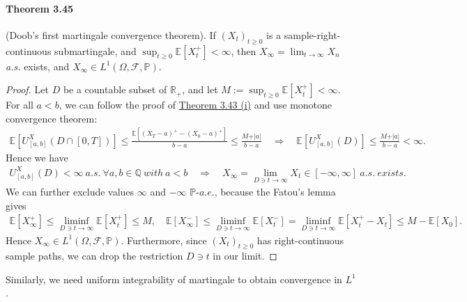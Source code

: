 \documentclass{article}
\numberwithin{equation}{section}
\newcommand{\E}{\mathbb{E}}
\renewcommand{\P}{\mathbb{P}}
\theoremstyle{plain}
\theoremstyle{definition}
\begin{document}
\paragraph{Theorem 3.45\label{thm:3.45}} (Doob's first martingale convergence theorem). If $(X_t)_{t\geq 0}$ is a sample-right-continuous submartingale, and $\sup_{t\geq 0}\E[X_t^+]<\infty$, then $X_\infty=\lim_{t\to\infty}X_n$ \textit{a.s.} exists, and $X_\infty\in L^1(\Omega,\mathscr{F},\P)$.
\begin{proof}
Let $D$ be a countable subset of $\mathbb{R}_+$, and let $M:=\sup_{t\geq 0}\E[X_t^+]<\infty$. For all $a<b$, we can follow the proof of \hyperref[thm:3.43]{Theorem 3.43 (i)} and use monotone convergence theorem:
\begin{align*}
	\E\left[U_{[a,b]}^X(D\cap[0,T])\right]\leq\frac{\E[(X_T-a)^+-(X_0-a)^+]}{b-a}\leq\frac{M+\vert a\vert}{b-a} \quad\Rightarrow\quad \E\left[U_{[a,b]}^X(D)\right]\leq\frac{M+\vert a\vert}{b-a} < \infty.
\end{align*}
Hence we have
\begin{align*}
	U_{[a,b]}^X(D)<\infty\ a.s.\ \forall a,b\in\mathbb{Q}\ with\ a<b\quad\Rightarrow\quad X_\infty=\lim_{D\ni t\to\infty} X_t\in[-\infty,\infty]\ a.s.\ exists.
\end{align*}
We can further exclude values $\infty$ and $-\infty$ $\P$-$a.e.$, because the Fatou's lemma gives
\begin{align*}
	\E[X_\infty^+]\leq\liminf_{D\ni t\to\infty}\E[X_t^+]\leq M,\quad \E[X_\infty^-]\leq\liminf_{D\ni t\to\infty}\E[X_t^-]=\liminf_{D\ni t\to\infty}\E[X_t^+-X_t]\leq M-\E[X_0].
\end{align*}
Hence $X_\infty\in L^1(\Omega,\mathscr{F},\P)$. Furthermore, since $(X_t)_{t\geq 0}$ has right-continuous sample paths, we can drop the restriction $D\ni t$ in our limit.
\end{proof}

Similarly, we need uniform integrability of martingale to obtain convergence in $L^1$.
\end{document}
